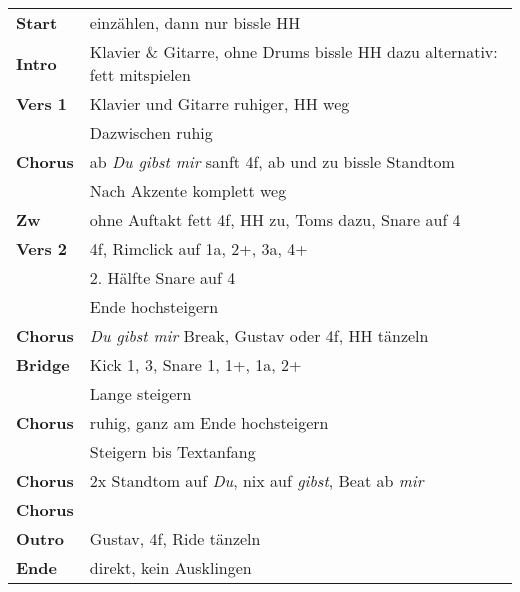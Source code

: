 
\begin{tabular}{p{1.6cm}l}
	\textbf{Start}  & einzählen, dann nur bissle HH                                             \\
	\textbf{Intro}  & Klavier \& Gitarre, ohne Drums bissle HH dazu alternativ: fett mitspielen \\
	\textbf{Vers 1} & Klavier und Gitarre ruhiger, HH weg                                       \\
	                & Dazwischen ruhig                                                          \\
	\textbf{Chorus} & ab \textit{Du gibst mir} sanft 4f, ab und zu bissle Standtom              \\
	                & Nach Akzente komplett weg                                                 \\
	\textbf{Zw}     & ohne Auftakt fett 4f, HH zu, Toms dazu, Snare auf 4                       \\
	\textbf{Vers 2} & 4f, Rimclick auf 1a, 2+, 3a, 4+                                           \\
	                & 2. Hälfte Snare auf 4                                                     \\
	                & Ende hochsteigern                                                         \\
	\textbf{Chorus} & \textit{Du gibst mir} Break, Gustav oder 4f, HH tänzeln                   \\
	\textbf{Bridge} & Kick 1, 3, Snare 1, 1+, 1a, 2+                                            \\
	                & Lange steigern                                                            \\
	\textbf{Chorus} & ruhig, ganz am Ende hochsteigern                                          \\
	                & Steigern bis Textanfang                                                   \\
	\textbf{Chorus} & 2x Standtom auf \textit{Du}, nix auf \textit{gibst}, Beat ab \textit{mir} \\
	\textbf{Chorus} &                                                                           \\
	\textbf{Outro}  & Gustav, 4f, Ride tänzeln                                                  \\
	\textbf{Ende}   & direkt, kein Ausklingen                                                   \\
\end{tabular}

